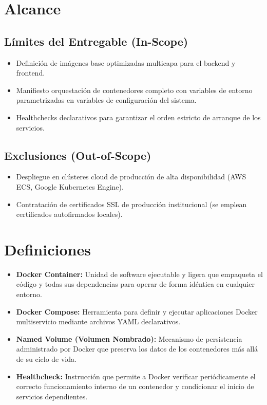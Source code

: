 \documentclass[12pt,a4paper]{article}
\begin{document}
\section{Alcance}
\subsection{Límites del Entregable (In-Scope)}
\begin{itemize}[leftmargin=1.5em, itemsep=2pt]
    \item Definición de imágenes base optimizadas multicapa para el backend y frontend.
    \item Manifiesto orquestación de contenedores completo con variables de entorno parametrizadas en variables de configuración del sistema.
    \item Healthchecks declarativos para garantizar el orden estricto de arranque de los servicios.
\end{itemize}
\subsection{Exclusiones (Out-of-Scope)}
\begin{itemize}[leftmargin=1.5em, itemsep=2pt]
    \item Despliegue en clústeres cloud de producción de alta disponibilidad (AWS ECS, Google Kubernetes Engine).
    \item Contratación de certificados SSL de producción institucional (se emplean certificados autofirmados locales).
\end{itemize}

\section{Definiciones}
\begin{itemize}[leftmargin=1.5em, itemsep=2pt]
    \item \textbf{Docker Container:} Unidad de software ejecutable y ligera que empaqueta el código y todas sus dependencias para operar de forma idéntica en cualquier entorno.
    \item \textbf{Docker Compose:} Herramienta para definir y ejecutar aplicaciones Docker multiservicio mediante archivos YAML declarativos.
    \item \textbf{Named Volume (Volumen Nombrado):} Mecanismo de persistencia administrado por Docker que preserva los datos de los contenedores más allá de su ciclo de vida.
    \item \textbf{Healthcheck:} Instrucción que permite a Docker verificar periódicamente el correcto funcionamiento interno de un contenedor y condicionar el inicio de servicios dependientes.
\end{itemize}
\end{document}
